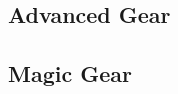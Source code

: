 \subsection{Advanced Gear}
\begin{multicols}{2}
\end{multicols}

\subsection{Magic Gear}
\begin{multicols}{2}
\end{multicols}
